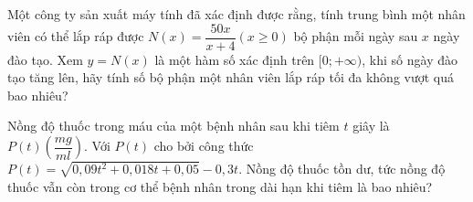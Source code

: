 \begin{bt}%
	Một công ty sản xuất máy tính đã xác định được rằng, tính trung bình một nhân viên có thể lắp ráp được $N(x)=\dfrac{50 x}{x+4}(x \geq 0)$ bộ phận mỗi ngày sau $x$ ngày đào tạo. Xem $y=N(x)$ là một hàm  số xác định trên $[0;+\infty)$, khi số ngày đào tạo tăng lên, hãy tính số bộ phận một nhân viên lắp ráp tối đa không vượt quá bao nhiêu?
\end{bt}

\begin{bt}%
	Nồng độ thuốc trong máu của một bệnh nhân sau khi tiêm $t$ giây là $P(t) \left(\dfrac{mg}{m l}\right)$. Với $P(t)$ cho bởi công thức $P(t)=\sqrt{0{,}09 t^{2}+0{,}018t+0{,}05}-0{,}3t$. Nồng độ thuốc tồn dư, tức nồng độ thuốc vẫn còn trong cơ thể bệnh  nhân trong dài hạn khi tiêm là bao nhiêu?
\end{bt}

